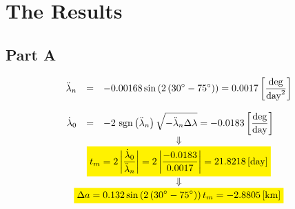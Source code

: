\documentclass[12pt, a4paper]{article}
\begin{document}
\newpage

\section{The Results}
\subsection{Part A}
\begin{equation}
    \begin{matrix}
        \begin{array}{rcl}
            \ddot{\lambda}_n&=&\displaystyle-0.00168\sin\left(2\left(30^\circ-75^\circ\right)\right)=0.0017\left[\frac{\mathrm{deg}}{\mathrm{day}^2}\right] \\\\
            \dot{\lambda}_0&=&\displaystyle-2\mathrm{\ sgn}\left(\ddot{\lambda}_n\right)\sqrt{-\ddot{\lambda}_n\Delta\lambda}=-0.0183\left[\frac{\mathrm{deg}}{\mathrm{day}}\right] \\
        \end{array} \\
        \Downarrow \\
        \colorbox{yellow}{$\displaystyle t_m=2\left|\frac{\dot{\lambda}_0}{\ddot{\lambda}_n}\right|=2\left|\frac{-0.0183}{0.0017}\right|=21.8218\left[\mathrm{day}\right]$} \\
        \Downarrow \\
        \colorbox{yellow}{$\displaystyle\Delta a=0.132\sin\left(2\left(30^\circ-75^\circ\right)\right)t_m=-2.8805\left[\mathrm{km}\right]$}
    \end{matrix}
\end{equation}
\end{document}
